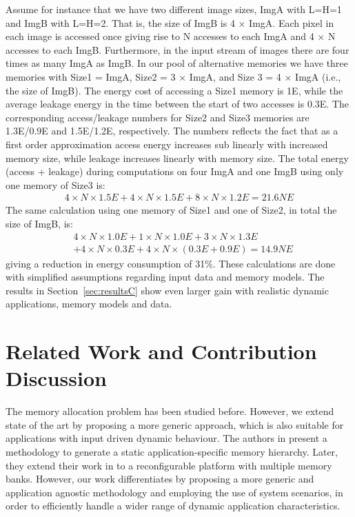 Assume for instance that we have two different image sizes, ImgA with L=H=1 and ImgB with L=H=2. 
That is, the size of ImgB is 4 $\times$ ImgA. 
Each pixel in each image is accessed once giving rise to N accesses to each ImgA and 4 $\times$ N accesses to each ImgB. 
Furthermore, in the input stream of images there are four times as many ImgA as ImgB. 
In our pool of alternative memories we have three memories with Size1 = ImgA, Size2  = 3 $\times$ ImgA, and Size 3 = 4 $\times$ ImgA (i.e., the size of ImgB). 
The energy cost of accessing a Size1 memory is 1E, while the average leakage energy in the time between the start of two accesses is 0.3E. 
The corresponding access/leakage numbers for Size2 and Size3 memories are 1.3E/0.9E and 1.5E/1.2E, respectively. 
The numbers reflects the fact that as a first order approximation access energy increases sub linearly with increased memory size, while leakage increases linearly with memory size. 
The total energy (access + leakage) during computations on four ImgA and one ImgB using only one memory of Size3 is:
\begin{align*}
4 \times N \times 1.5E + 4 \times N \times 1.5E + 8 \times N \times 1.2E = 21.6NE
\end{align*}
The same calculation using one memory of Size1 and one of Size2, in total the size of ImgB, is: 
\begin{align*}
& 4 \times N \times 1.0E + 1 \times N \times 1.0E + 3 \times N \times 1.3E \\
& + 4 \times N \times 0.3E + 4 \times N \times (0.3E + 0.9E) =  14.9NE
\end{align*}
giving a reduction in energy consumption of 31\%. 
These calculations are done with simplified assumptions regarding input data and memory models. 
The results in Section~\ref{sec:resultsC} show even larger gain with realistic dynamic applications, memory models and data.

\section{Related Work and Contribution Discussion}
\label{sec:relatedC}

The memory allocation problem has been studied before. 
However, we extend state of the art by proposing a more generic approach, which is also suitable for applications with input driven dynamic behaviour. 
The authors in \cite{Ben00b} present a methodology to generate a static application-specific memory hierarchy. 
Later, they extend their work in \cite{Ben00c} to a reconfigurable platform with multiple memory banks. 
However, our work differentiates by proposing a more generic and application agnostic methodology and employing the use of system scenarios, in order to efficiently handle a wider range of dynamic application characteristics. 

